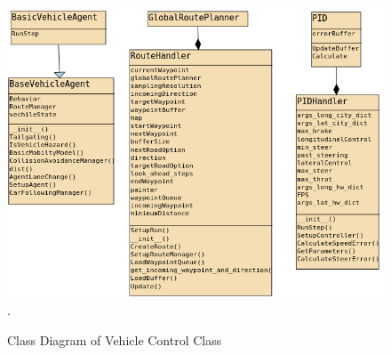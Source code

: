 \begin{figure}[h!]
    \centering
    \includegraphics[width=15cm]{Framework/Images/CD3.png}.
    \caption{Class Diagram of Vehicle Control Class}
\end{figure}

